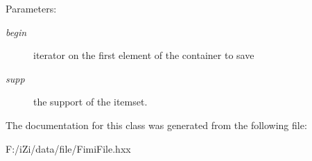 \begin{Desc}
\item[Parameters:]
\begin{description}
\item[{\em begin}]iterator on the first element of the container to save \item[{\em supp}]the support of the itemset. \end{description}
\end{Desc}


The documentation for this class was generated from the following file:\begin{CompactItemize}
\item 
F:/i\-Zi/data/file/Fimi\-File.hxx\end{CompactItemize}
